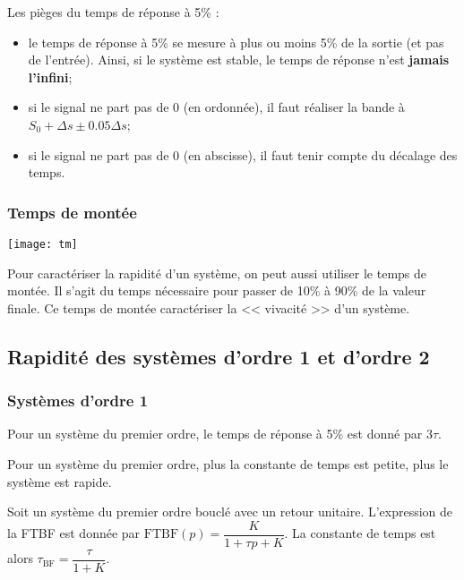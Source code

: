 \begin{exemple}
Les pièges du temps de réponse à 5\% :
\begin{itemize}
\item le temps de réponse à 5\% se mesure à plus ou moins 5\% de la sortie (et pas de l'entrée). Ainsi, si le système est stable, le temps de réponse n'est \textbf{jamais l'infini};
\item si le signal ne part pas de 0 (en ordonnée), il faut réaliser la bande à $S_0+\Delta s \pm 0.05\Delta s$;
\item si le signal ne part pas de 0 (en abscisse), il faut tenir compte du décalage des temps.
\end{itemize}

\end{exemple}

\subsubsection{Temps de montée}


\begin{marginfigure}
\centering
\texttt{[image: tm]}
\end{marginfigure}

Pour caractériser la rapidité d'un système, on peut aussi utiliser le temps de montée. Il s'agit du temps nécessaire pour passer de 10\% à 90\% de la valeur finale. Ce temps de montée caractériser la << vivacité >> d'un système. 

\subsection{Rapidité des systèmes d'ordre 1 et d'ordre 2}
\subsubsection{Systèmes d'ordre 1}
Pour un système du premier ordre, le temps de réponse à 5\% est donné par $3\tau$.
\begin{resultat}
Pour un système du premier ordre, plus la constante de temps est petite, plus le système est rapide.
\end{resultat}

Soit un système du premier ordre bouclé avec un retour unitaire. L'expression de la FTBF est donnée par $\text{FTBF}(p)=\dfrac{K}{1+\tau p + K}$. La constante de temps est alors $\tau_{\text{BF}}=\dfrac{\tau}{1+K}$. 


